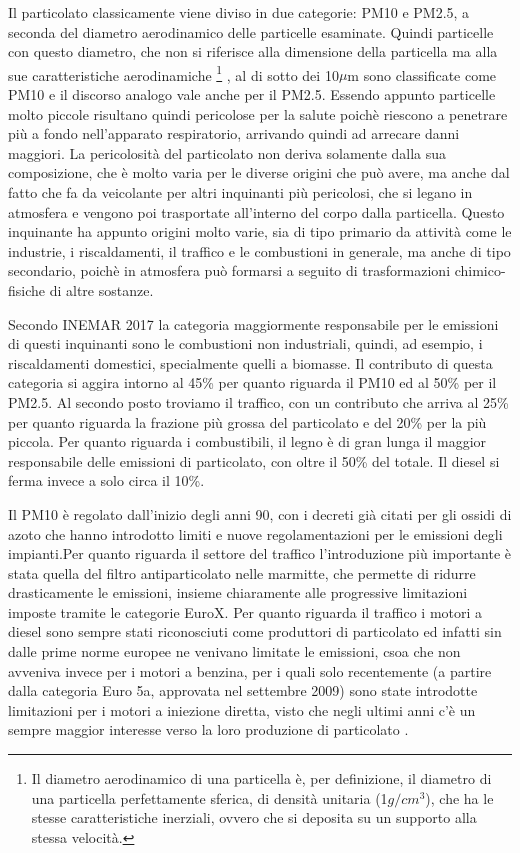 \documentclass[a4paper]{report}
\begin{document}
Il particolato classicamente viene diviso in due categorie: PM10 e PM2.5, a seconda del diametro aerodinamico delle particelle esaminate. Quindi particelle con questo diametro, che non si riferisce alla dimensione della particella ma alla sue caratteristiche aerodinamiche
\footnote{Il diametro aerodinamico di una particella è, per definizione, il diametro di una particella perfettamente sferica, di densità unitaria (1$g/cm^3$), che ha le stesse caratteristiche inerziali, ovvero che si deposita su un supporto alla stessa velocità.}
, al di sotto dei 10$\mu$m sono classificate come PM10 e il discorso analogo vale anche per il PM2.5. Essendo appunto particelle molto piccole risultano quindi pericolose per la salute poichè riescono a penetrare più a fondo nell'apparato respiratorio, arrivando quindi ad arrecare danni maggiori. La pericolosità del particolato non deriva solamente dalla sua composizione, che è molto varia per le diverse origini che può avere, ma anche dal fatto che fa da veicolante per altri inquinanti più pericolosi, che si legano in atmosfera e vengono poi trasportate all'interno del corpo dalla particella. Questo inquinante ha appunto origini molto varie, sia di tipo primario da attività come le industrie, i riscaldamenti, il traffico e le combustioni in generale, ma anche di tipo secondario, poichè in atmosfera può formarsi a seguito di trasformazioni chimico-fisiche di altre sostanze.

Secondo INEMAR 2017 \cite{inemar2017}
 la categoria maggiormente responsabile per le emissioni di questi inquinanti sono le combustioni non industriali, quindi, ad esempio, i riscaldamenti domestici, specialmente quelli a biomasse. Il contributo di questa categoria si aggira intorno al 45\% per quanto riguarda il PM10 ed al 50\% per il PM2.5. Al secondo posto troviamo il traffico, con un contributo che arriva al 25\% per quanto riguarda la frazione più grossa del particolato e del 20\% per la più piccola. Per quanto riguarda i combustibili, il legno è di gran lunga il maggior responsabile delle emissioni di particolato, con oltre il 50\% del totale. Il diesel si ferma invece a solo circa il 10\%.

Il PM10 è regolato dall'inizio degli anni 90, con i decreti già citati per gli ossidi di azoto che hanno introdotto limiti e nuove regolamentazioni per le emissioni degli impianti.Per quanto riguarda il settore del traffico l'introduzione più importante è stata quella del filtro antiparticolato nelle marmitte, che permette di ridurre drasticamente le emissioni, insieme chiaramente alle progressive limitazioni imposte tramite le categorie EuroX. 
Per quanto riguarda il traffico i motori a diesel sono sempre stati riconosciuti come produttori di particolato ed infatti sin dalle prime norme europee ne venivano limitate le emissioni, csoa che non avveniva invece per i motori a benzina, per i quali solo recentemente (a partire dalla categoria Euro 5a, approvata nel settembre 2009) sono state introdotte limitazioni per i motori a iniezione diretta, visto che negli ultimi anni c'è un sempre maggior interesse verso la loro produzione di particolato  \cite{Raza_2018}. 
\end{document}
